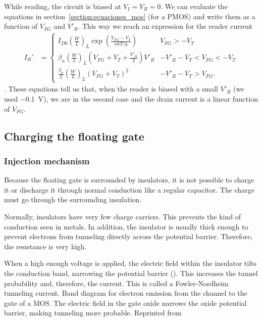 While reading, the circuit is biased at $V_I=V_R=0$.
We can evaluate the equations in section~\ref{section:ecuaciones_mos}
(for a PMOS) and write them as a function of $V_{FG}$ and $V'_R$.
This way we reach an expression for the reader current
\begin{align*}
    I_R' &= \begin{cases}
        I_{D0} \left(\frac W L\right)_L
        \exp\left(\frac{V_{FG}-V_T}{nkT/q}\right)& V_{FG}>-V_T\\
        \beta_n\left(\frac W L\right)_L(V_{FG}+V_T+\frac{V'_R}2)V'_R &
        -V'_R-V_T<V_{FG}<-V_T\\
        \frac{\beta_n}2\left(\frac W L\right)_L(V_{FG}+V_T)^2 &
        -V'_R-V_T>V_{FG}.
    \end{cases}
\end{align*}
. These equations tell us that,
when the reader is biased with a small
$V'_R$ (we used \SI{-0.1}{\volt}),
we are in the second case and the drain current
is a linear function of $V_{FG}$.
\subsection{Charging the floating gate}
%
\subsubsection{Injection mechanism}
Because the floating gate is surrounded by insulators,
it is not possible to charge it or discharge it through normal conduction
like a regular capacitor.
The charge must go through the surrounding insulation.

Normally, insulators have very few charge carriers.
This prevents the kind of conduction seen in metals.
In addition, the insulator is usually thick enough
to prevent electrons from tunneling directly across the potential barrier.
Therefore, the resistance is very high.

When a high enough voltage is applied,
the electric field within the insulator tilts the conduction band,
narrowing the potential barrier
().
This increases the tunnel probability and, therefore, the current.
This is called a
Fowler-Nordheim tunneling current\cite{lenzlinger_fowlernordheim_1969}.
{Band diagram for electron emission from the channel to the gate of a MOS.
The electric field in the gate oxide narrows the oxide potential barrier,
making tunneling more probable.
Reprinted from \cite{lenzlinger_fowlernordheim_1969}}

